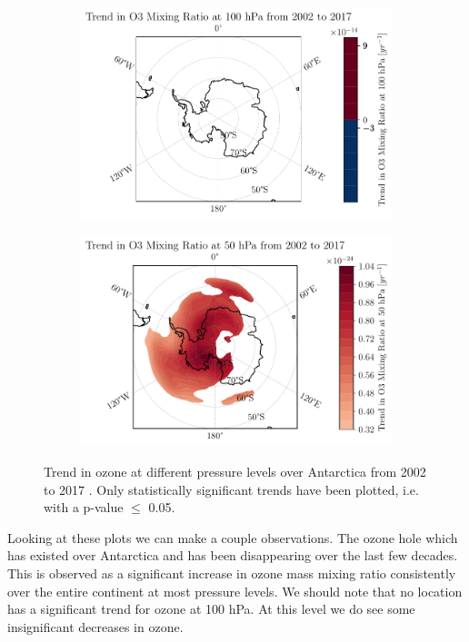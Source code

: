 \documentclass[../main.tex]{subfiles}
\begin{document}
\begin{figure}[!hbt]
\begin{subfigure}[b]{0.5\textwidth}
    \end{subfigure}
    \begin{subfigure}[b]{0.5\textwidth}
    \includegraphics[width=\textwidth]{images/2021w5/chapter7/hres/trend_spatial_o3_100}
    \end{subfigure}
    \begin{subfigure}[b]{0.5\textwidth}
    \includegraphics[width=\textwidth]{images/2021w5/chapter7/hres/trend_spatial_o3_50}
    \end{subfigure}
    \caption{Trend in ozone at different pressure levels over Antarctica from 2002 to 2017 . Only statistically significant trends have been plotted, i.e. with a p-value $\leq$ 0.05.}
    \label{fig:trend_o3_02_17}
\end{figure}

Looking at these plots we can make a couple observations. The ozone hole which has existed over Antarctica and has been disappearing over the last few decades. This is observed as a significant increase in ozone mass mixing ratio consistently over the entire continent at most pressure levels. We should note that no location has a significant trend for ozone at 100 hPa. At this level we do see some insignificant decreases in ozone.
\end{document}
